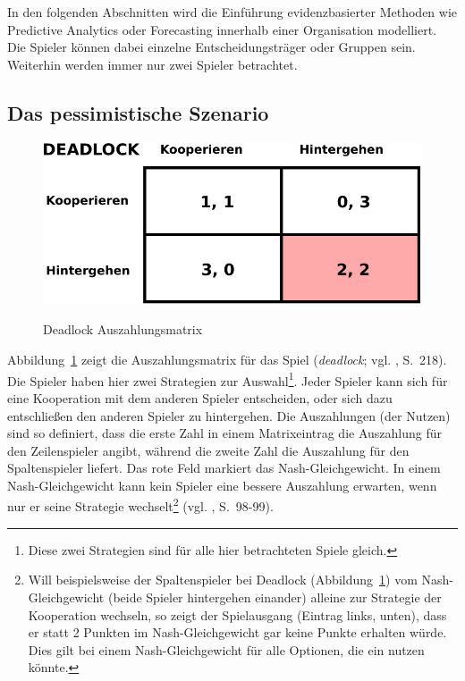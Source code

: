 In den folgenden Abschnitten wird die Einführung evidenzbasierter Methoden wie Predictive Analytics oder Forecasting innerhalb einer
Organisation modelliert. Die Spieler können dabei einzelne Entscheidungsträger oder Gruppen sein. Weiterhin werden immer nur zwei Spieler
betrachtet. 


\subsection{Das pessimistische Szenario}

\begin{figure}%
\centering
\caption{Deadlock Auszahlungsmatrix}
\includegraphics[scale=0.8]{Grafiken/Deadlock_Ink.pdf} 
\label{pic:Deadlock}
\end{figure}

Abbildung~\ref{pic:Deadlock} zeigt die Auszahlungsmatrix für das Spiel \grqq{}
(\emph{deadlock}; vgl. \cite{Poundstone}, S.~218). Die Spieler haben hier zwei Strategien zur Auswahl\footnote{
Diese zwei Strategien sind für alle hier betrachteten Spiele gleich.
}. Jeder Spieler kann sich für eine Kooperation mit dem anderen Spieler entscheiden, oder sich dazu entschließen
den anderen Spieler zu hintergehen. Die Auszahlungen (der Nutzen) sind so definiert, dass die erste Zahl in einem Matrixeintrag
die Auszahlung für den Zeilenspieler angibt, während die zweite Zahl die Auszahlung für den Spaltenspieler liefert.
Das rote Feld markiert das Nash-Gleichgewicht. In einem Nash-Gleichgewicht kann kein Spieler eine bessere Auszahlung erwarten, wenn
nur er seine Strategie wechselt\footnote{
Will beispielsweise der Spaltenspieler bei Deadlock (Abbildung~\ref{pic:Deadlock}) vom Nash-Gleichgewicht (beide Spieler hintergehen
einander) alleine zur Strategie der Kooperation wechseln, so zeigt der Spielausgang (Eintrag links, unten), dass er statt 2 Punkten
im Nash-Gleichgewicht gar keine Punkte erhalten würde. Dies gilt bei einem Nash-Gleichgewicht für alle Optionen, die ein
\grqq{} nutzen könnte.
} (vgl. \cite{Poundstone}, S.~98-99).

